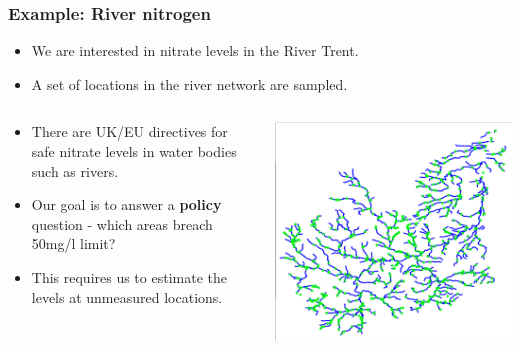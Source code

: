\documentclass[parskip,12pt]{beamer}
\begin{document}
\begin{frame}
\frametitle{Example: River nitrogen}
 \begin{itemize}
\vspace{3mm}
\item We are interested in nitrate levels in the River Trent.
\vspace{3mm}
\item A set of locations in the river network are sampled.
\end{itemize}
\begin{columns}
\begin{column}{0.56\textwidth}
\begin{itemize}
\item There are UK/EU directives for safe nitrate levels in water bodies such as rivers.
\vspace{3mm}
\item Our goal is to answer a \textbf{policy} question - which areas breach 50mg/l limit?
\vspace{3mm}
\item This requires us to estimate the levels at unmeasured locations.
\end{itemize}
\end{column}
\begin{column}{0.32\textwidth}
    \begin{center}
     \includegraphics[width=\textwidth]{TrentNetwork}\\

\end{center}
\end{column}
\end{columns}
\end{frame}
\end{document}
